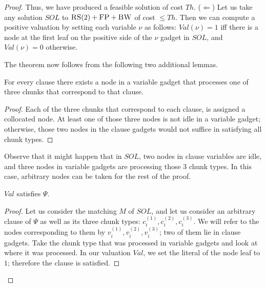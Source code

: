 \documentclass[9pt]{sigcomm-alternate}
\newcommand{\variab}{\nu}
\newcommand{\achunk}{\ensuremath{c}}
\newcommand{\FP}{\textsc{FP}}
\newcommand{\RS}{\textsc{RS}}
\newcommand{\BW}{\textsc{BW}}
\newcommand{\Formula}{\ensuremath{\Psi}}
\newcommand{\Thr}{\ensuremath{Th}}
\newcommand{\Val}{\ensuremath{Val}}
\newcommand{\Sol}{\ensuremath{SOL}}
\begin{document}
\begin{appendix}
\begin{proof}
Thus, we have produced a feasible solution of cost $\Thr$.
($\Leftarrow$)
Let us take any solution $\Sol$ to $\RS(2)+\FP+\BW$ of cost $\leq \Thr$.
Then we can compute a positive valuation by setting each variable $\variab$
as follows:
$\Val(\variab)= 1$ iff there is a node at the first leaf on the positive side of the $\variab$ gadget in $\Sol$,
and $\Val(\variab)=0$ otherwise.


The theorem now follows from the following two additional lemmas.
\begin{lemma}
For every clause there exists a node in a variable gadget that processes one of
  three chunks that correspond to that clause.
\end{lemma}
\begin{proof}
 Each of the three chunks that correspond to each clause,
 is assigned a collocated node.
 At least one of those three nodes is not idle in a variable gadget;
otherwise, those two nodes in the clause gadgets would not suffice in
satisfying all chunk types.
\end{proof}

Observe that it might happen that in $\Sol$, two nodes in
clause variables are idle, and three nodes in variable gadgets are
processing those $3$ chunk types. In this case, 
arbitrary nodes can be taken for the rest
of the proof.

\begin{lemma}
$\Val$ satisfies $\Formula$.
\end{lemma}
\begin{proof}
Let us consider the matching $M$ of $\Sol$, and let us consider an arbitrary clause of
$\Formula$ as well as its three chunk types: $\achunk_i^{(1)}, \achunk_i^{(2)}, \achunk_i^{(3)}$.
We will refer to the nodes corresponding to them
by $v_i^{(1)}, v_i^{(2)}, v_i^{(3)}$; two of them lie in clause gadgets.
Take the chunk type that was processed in variable
gadgets and look at where it was processed.
In our valuation $\Val$, we set the literal of the node leaf to
$1$; therefore the clause is satisfied.
\end{proof}
\end{proof}

\end{appendix}
\end{document}
